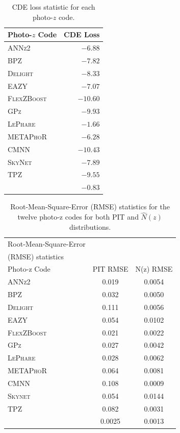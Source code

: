 \begin{table}  %
\centering
\caption{CDE loss statistic for each photo-$z$ code.} \label{tab:cdeloss}
\begin{tabular}{lr}
\hline
\bf Photo-$z$ Code & \bf CDE Loss \\
\hline
\textsc{ANNz2} 		& $-6.88$ \\
\textsc{BPZ} 		& $-7.82$ \\
\textsc{Delight}    & $-8.33$\\
\textsc{EAZY}       & $-7.07$ \\
\textsc{FlexZBoost} & $-10.60$\\
\textsc{GPz} 		& $-9.93$ \\
\textsc{LePhare} 	& $-1.66$ \\
\textsc{METAPhoR} 	& $-6.28$ \\
\textsc{CMNN}         & $-10.43$ \\
\textsc{SkyNet} 	& $-7.89$ \\
\textsc{TPZ} 		& $-9.55$ \\
\hline
\trainz		& $-0.83$ \\
\end{tabular}
\end{table}

\begin{table}
\setlength{\tabcolsep}{2pt}
\begin{center}
\caption{Root-Mean-Square-Error (RMSE) statistics for the twelve photo-z codes for both PIT and $\hat{N}(z)$ distributions.}\label{tab:rmse}
\begin{tabular}{lcc}
\hline
\hline
Root-Mean-Square-Error \\
(RMSE) statistics \\
\hline
Photo-z Code & PIT RMSE & N(z) RMSE\\
\hline
\textsc{ANNz2}      & 0.019 & 0.0054\\
\textsc{BPZ}        & 0.032 & 0.0050\\
\textsc{Delight}    & 0.111 & 0.0056\\
\textsc{EAZY}       & 0.054 & 0.0102\\
\textsc{FlexZBoost} & 0.021 & 0.0022\\
\textsc{GPz}        & 0.027 & 0.0042\\
\textsc{LePhare}    & 0.028 & 0.0062\\
\textsc{METAPhoR}   & 0.064 & 0.0081\\
\textsc{CMNN}         & 0.108 & 0.0009\\
\textsc{Skynet}     & 0.054 & 0.0144\\
\textsc{TPZ}        & 0.082 & 0.0031\\
\hline
\trainz		& 0.0025 & 0.0013\\
\end{tabular}
\end{center}
\end{table}

